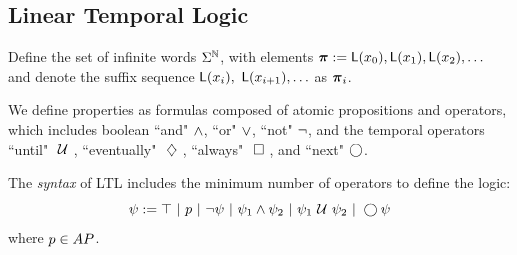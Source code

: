 \documentclass{ifacconf}
\begin{document}
  
    \subsection{Linear Temporal Logic}
    
    Define the set of infinite
    words $\Sigma^{\mathbb N}$,  with elements 
${\boldsymbol{\pi}}:=\mathsf{L}(x_0),\mathsf{L}(x_1),\mathsf{L}(x_2), \ldots$ and denote the suffix sequence  $\mathsf{L}(x_i),$ $\mathsf{L}(x_{i+1}), \ldots$ as ${\boldsymbol{\pi}}_i$.

   
 We define properties as formulas composed of atomic propositions and operators, which includes boolean ``and" $\wedge$, ``or" $\vee$, ``not" $\neg$, and the temporal operators ``until" $\ \mathcal{U}\ $, ``eventually" $\ \diamondsuit\ $, ``always" $\ \square\ $, and ``next" $\bigcirc$.
    \begin{definition}
    \label{def:gdtl-syntax}
    The {\em syntax} of LTL includes the minimum number of operators to define the logic:
    \begin{equation*}
     \psi :=  \True \ |\ p \ |\ \notltl \psi \ |\ \psi_1 \andltl \psi_2 \ |\ \psi_1 \Until \psi_2 \ |\ \Next \psi
    \end{equation*} 
    where $p\in AP$.
    \end{definition}
\end{document}
